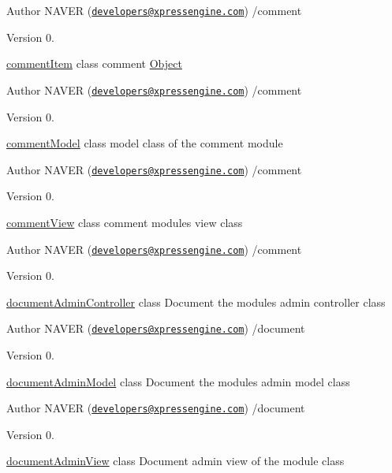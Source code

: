 \begin{DoxyAuthor}{Author}
N\+A\+V\+ER (\href{mailto:developers@xpressengine.com}{\tt developers@xpressengine.\+com}) /comment 
\end{DoxyAuthor}
\begin{DoxyVersion}{Version}
0.
\end{DoxyVersion}
\hyperlink{classcommentItem}{comment\+Item} class comment \hyperlink{classObject}{Object}

\begin{DoxyAuthor}{Author}
N\+A\+V\+ER (\href{mailto:developers@xpressengine.com}{\tt developers@xpressengine.\+com}) /comment 
\end{DoxyAuthor}
\begin{DoxyVersion}{Version}
0.
\end{DoxyVersion}
\hyperlink{classcommentModel}{comment\+Model} class model class of the comment module

\begin{DoxyAuthor}{Author}
N\+A\+V\+ER (\href{mailto:developers@xpressengine.com}{\tt developers@xpressengine.\+com}) /comment 
\end{DoxyAuthor}
\begin{DoxyVersion}{Version}
0.
\end{DoxyVersion}
\hyperlink{classcommentView}{comment\+View} class comment module\textquotesingle{}s view class

\begin{DoxyAuthor}{Author}
N\+A\+V\+ER (\href{mailto:developers@xpressengine.com}{\tt developers@xpressengine.\+com}) /comment 
\end{DoxyAuthor}
\begin{DoxyVersion}{Version}
0.
\end{DoxyVersion}
\hyperlink{classdocumentAdminController}{document\+Admin\+Controller} class Document the module\textquotesingle{}s admin controller class

\begin{DoxyAuthor}{Author}
N\+A\+V\+ER (\href{mailto:developers@xpressengine.com}{\tt developers@xpressengine.\+com}) /document 
\end{DoxyAuthor}
\begin{DoxyVersion}{Version}
0.
\end{DoxyVersion}
\hyperlink{classdocumentAdminModel}{document\+Admin\+Model} class Document the module\textquotesingle{}s admin model class

\begin{DoxyAuthor}{Author}
N\+A\+V\+ER (\href{mailto:developers@xpressengine.com}{\tt developers@xpressengine.\+com}) /document 
\end{DoxyAuthor}
\begin{DoxyVersion}{Version}
0.
\end{DoxyVersion}
\hyperlink{classdocumentAdminView}{document\+Admin\+View} class Document admin view of the module class

